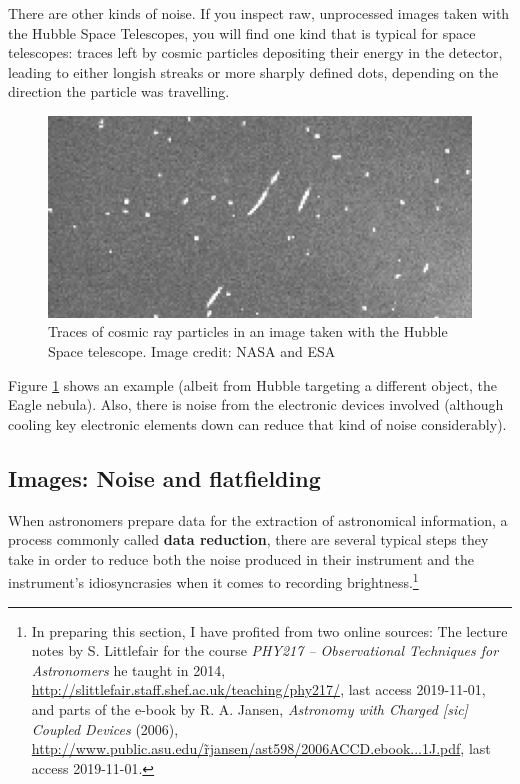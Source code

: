 \documentclass[twocolumn,apj]{openjournal}
\begin{document}
There are other kinds of noise. If you inspect raw, unprocessed images taken with the Hubble Space Telescopes, you will find one kind that is typical for space telescopes: traces left by cosmic particles depositing their energy in the detector, leading to either longish streaks or more sharply defined dots, depending on the direction the particle was travelling. 
\begin{figure}[htbp]
\begin{center}
\includegraphics[width=\linewidth]{cosmic-ray-traces.jpg}
\caption{Traces of cosmic ray particles in an image taken with the Hubble Space telescope. Image credit: NASA and ESA}
\label{CosmicRayTraces}
\end{center}
\end{figure}
Figure \ref{CosmicRayTraces} shows an example (albeit from Hubble targeting a different object, the Eagle nebula). Also, there is noise from the electronic devices involved (although cooling key electronic elements down can reduce that kind of noise considerably).

\subsection{Images: Noise and flatfielding}

When astronomers prepare data for the extraction of astronomical information, a process commonly called {\bf data reduction}, there are several typical steps they take in order to reduce both the noise produced in their instrument and the instrument's idiosyncrasies when it comes to recording brightness.\footnote{In preparing this section, I have profited from two online sources: The lecture notes by S. Littlefair for the course {\em PHY217 -- Observational Techniques for Astronomers} he taught in 2014, \href{http://slittlefair.staff.shef.ac.uk/teaching/phy217/}{http://slittlefair.staff.shef.ac.uk/teaching/phy217/}, last access 2019-11-01,
and parts of the e-book by R. A. Jansen, {\em Astronomy with Charged [sic] Coupled Devices} (2006), \href{http://www.public.asu.edu/~rjansen/ast598/2006ACCD.ebook...1J.pdf}{http://www.public.asu.edu/\~rjansen/ast598/2006ACCD.ebook...1J.pdf}, last access 2019-11-01.
} 
\end{document}
